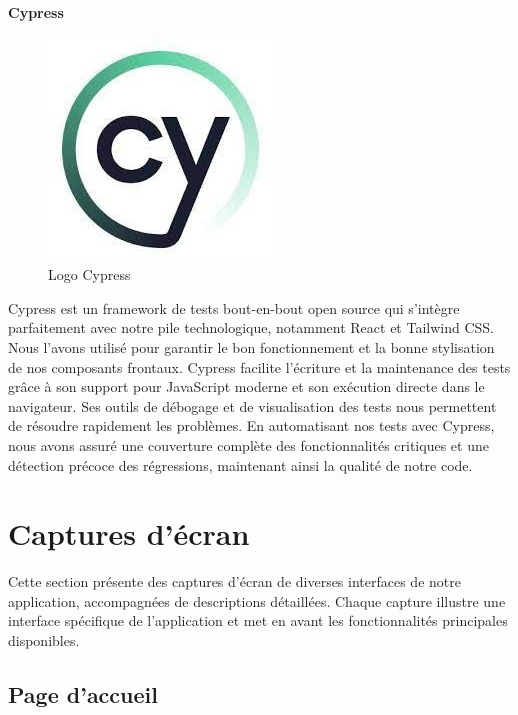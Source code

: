 \large
\textbf{Cypress}
\begin{figure}[htbp]
   \centering
   \includegraphics[scale=0.6]{Images/cy.jpg} 
   \caption{Logo Cypress}
   \label{fig:cypress}
\end{figure}

Cypress est un framework de tests bout-en-bout open source qui 
s'intègre parfaitement avec notre pile technologique, notamment 
React et Tailwind CSS. Nous l'avons utilisé pour garantir le bon 
fonctionnement et la bonne stylisation de nos composants 
frontaux. Cypress facilite l'écriture et la maintenance des 
tests grâce à son support pour JavaScript moderne et son 
exécution directe dans le navigateur. Ses outils de débogage 
et de visualisation des tests nous permettent de résoudre 
rapidement les problèmes\cite{Cypress}. En automatisant nos tests avec Cypress, 
nous avons assuré une couverture complète des fonctionnalités 
critiques et une détection précoce des régressions, maintenant 
ainsi la qualité de notre code.

\section{Captures d'écran}
Cette section présente des captures d'écran de diverses interfaces de notre application, 
accompagnées de descriptions  détaillées.  Chaque  capture  illustre une interface 
spécifique de l'application et met en avant les fonctionnalités principales disponibles. 
\subsection{Page d'accueil}


